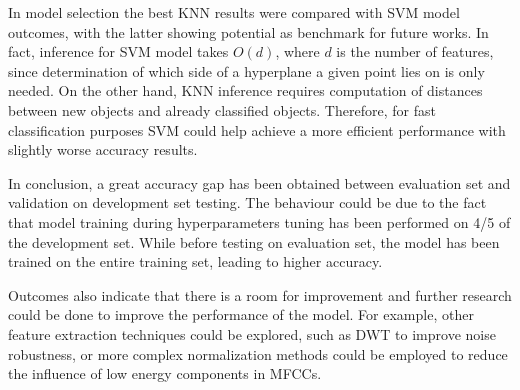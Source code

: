 \documentclass[conference]{IEEEtran}
\begin{document}
In model selection the best KNN results were compared with SVM model outcomes, with the latter showing potential as benchmark for future works.
In fact, inference for SVM model takes $O(d)$, where $d$ is the number of features, since determination of which side of a hyperplane a given point lies on is only needed.
On the other hand, KNN inference requires computation of distances between new objects and already classified objects.
Therefore, for fast classification purposes SVM could help achieve a more efficient performance with slightly worse accuracy results.

In conclusion, a great accuracy gap has been obtained between evaluation set and validation on development set testing.
The behaviour could be due to the fact that model training during hyperparameters tuning has been performed on 4/5 of the development set. 
While before testing on evaluation set, the model has been trained on the entire training set, leading to higher accuracy.

Outcomes also indicate that there is a room for improvement and further research could be done to improve the performance of the model.
For example, other feature extraction techniques could be explored, such as DWT to improve noise robustness, or more complex normalization methods could be employed to reduce the influence of low energy components in MFCCs.\\


\nocite{*}


\end{document}
